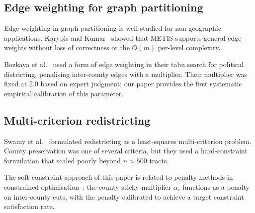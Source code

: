 \subsection{Edge weighting for graph partitioning}

Edge weighting in graph partitioning is well-studied for non-geographic
applications.  Karypis and Kumar~\citep{karypis1998} showed that METIS
supports general edge weights without loss of correctness or the $O(m)$
per-level complexity.

Bozkaya et al.~\citep{bozkaya2003zone} used a form of edge weighting in
their tabu search for political districting, penalising inter-county
edges with a multiplier.  Their multiplier was fixed at 2.0 based on expert
judgment; our paper provides the first systematic empirical calibration
of this parameter.

\subsection{Multi-criterion redistricting}

Swamy et al.~\citep{swamy2011least} formulated redistricting as a
least-squares multi-criterion problem.  County preservation was one of
several criteria, but they used a hard-constraint formulation that scaled
poorly beyond $n \approx 500$ tracts.

The soft-constraint approach of this paper is related to penalty methods in
constrained optimisation~\citep{mehrotra1998optimal}: the county-sticky
multiplier $\alpha_c$ functions as a penalty on inter-county cuts, with
the penalty calibrated to achieve a target constraint satisfaction rate.
